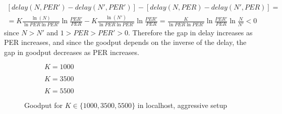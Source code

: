 \begin{equation}
\begin{split}
[delay(N,PER')-delay(N',PER')]-[delay(N,PER)-delay(N',PER)]=\\ 
=K\frac{\ln(N)}{\ln PER \ln PER'}\ln{\frac{PER'}{PER}}-K\frac{\ln(N')}{\ln PER \ln PER'}\ln{\frac{PER'}{PER}}=\frac{K}{\ln PER \ln PER'}\ln{\frac{PER'}{PER}}\ln{\frac{N}{N'}}<0
\end{split}
\end{equation}
since $N>N'$ and $1>PER>PER'>0$. Therefore the gap in delay increases as PER increases, and since the goodput depends on the inverse of the delay, the gap in goodput decreases as PER increases.
\begin{figure}[!hp]
\centering
\begin{subfigure}{0.24\textwidth}
	\captionsetup{justification=centering,font=scriptsize}
	\centering
	\setlength\fwidth{\textwidth}
	\setlength{}
	
	\caption{$K=1000$}
	\label{fig:lh_good_1000}
\end{subfigure}\hspace{2em}%
\begin{subfigure}{0.23\textwidth}
	\captionsetup{justification=centering,font=scriptsize}
	\centering
	\setlength\fwidth{\textwidth}
	\setlength{}
	
	\caption{$K=3500$}
	\label{fig:lh_good_3500}
\end{subfigure}\hspace{2em}%
\begin{subfigure}{0.23\textwidth}
	\captionsetup{justification=centering,font=scriptsize}
	\centering
	\setlength\fwidth{\textwidth}
	\setlength{}
	
	\caption{$K=5500$}
	\label{fig:lh_good_5500}
\end{subfigure}
\caption{Goodput for $K \in \{1000, 3500, 5500\}$ in localhost, aggressive setup}
\label{fig:goodput_aggr}
\end{figure}

